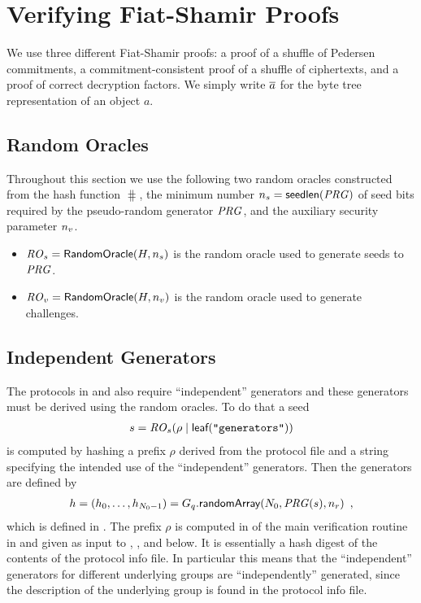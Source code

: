 \documentclass[11pt]{article}
\begin{document}
\section{Verifying Fiat-Shamir Proofs}\label{sect:basicverify}

We use three different Fiat-Shamir proofs: a proof of a shuffle of
Pedersen commitments, a commitment-consistent proof of a shuffle of
ciphertexts, and a proof of correct decryption factors. We simply
write $\overline{a}$ for the byte tree representation of an object $a$.

\subsection{Random Oracles}

Throughout this section we use the following two random oracles
constructed from the hash function $\hash$, the minimum number
${n_s}=\textsf{seedlen}(\mathit{PRG})$ of seed bits required by the pseudo-random
generator $\mathit{PRG}$, and the auxiliary security parameter $n_v$.
\begin{itemize}

\item $\mathit{RO}_s=\textsf{RandomOracle}(H,{n_s})$ is the random oracle used
  to generate seeds to $\mathit{PRG}$.

\item $\mathit{RO}_v=\textsf{RandomOracle}(H,n_v)$ is the random oracle used
  to generate challenges.

\end{itemize}


\subsection{Independent Generators}\label{sect:independent}

The protocols in  and  also require
``independent'' generators and these generators must be derived using
the random oracles. To do that a seed
\begin{align*}
  s=\mathit{RO}_s(\rho\mid\textsf{leaf}(\texttt{"generators"}))
\end{align*}
is computed by hashing a prefix $\rho$ derived from the protocol file
and a string specifying the intended use of the ``independent''
generators. Then the generators are defined by
\begin{align*}
  h=(h_{0},\ldots,h_{N_{0}-1})=G_{q}.\textsf{randomArray}(N_{0},\mathit{PRG}(s),n_r)\enspace,
\end{align*}
which is defined in . The prefix $\rho$ is computed
in  of the main verification routine in
 and given as input to , , and
 below. It is essentially a hash digest of the contents
of the protocol info file. In particular this means that the
``independent'' generators for different underlying groups are
``independently'' generated, since the description of the underlying
group is found in the protocol info file.
\end{document}
